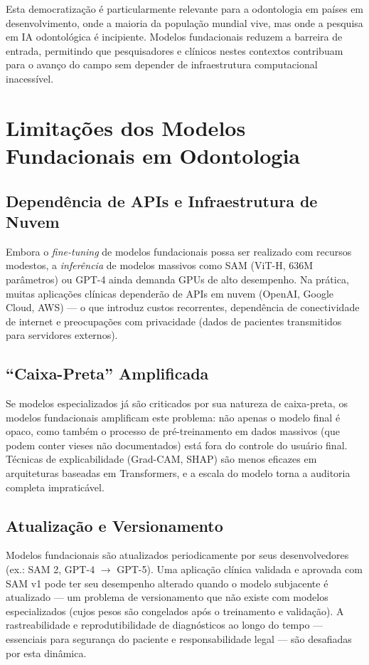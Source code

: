 Esta democratização é particularmente relevante para a odontologia em países em desenvolvimento, onde a maioria da população mundial vive, mas onde a pesquisa em IA odontológica é incipiente. Modelos fundacionais reduzem a barreira de entrada, permitindo que pesquisadores e clínicos nestes contextos contribuam para o avanço do campo sem depender de infraestrutura computacional inacessível.

\section{Limitações dos Modelos Fundacionais em Odontologia}

\subsection{Dependência de APIs e Infraestrutura de Nuvem}

Embora o \textit{fine-tuning} de modelos fundacionais possa ser realizado com recursos modestos, a \textit{inferência} de modelos massivos como SAM (ViT-H, 636M parâmetros) ou GPT-4 ainda demanda GPUs de alto desempenho. Na prática, muitas aplicações clínicas dependerão de APIs em nuvem (OpenAI, Google Cloud, AWS) --- o que introduz custos recorrentes, dependência de conectividade de internet e preocupações com privacidade (dados de pacientes transmitidos para servidores externos).

\subsection{``Caixa-Preta'' Amplificada}

Se modelos especializados já são criticados por sua natureza de caixa-preta, os modelos fundacionais amplificam este problema: não apenas o modelo final é opaco, como também o processo de pré-treinamento em dados massivos (que podem conter vieses não documentados) está fora do controle do usuário final. Técnicas de explicabilidade (Grad-CAM, SHAP) são menos eficazes em arquiteturas baseadas em Transformers, e a escala do modelo torna a auditoria completa impraticável.

\subsection{Atualização e Versionamento}

Modelos fundacionais são atualizados periodicamente por seus desenvolvedores (ex.: SAM 2, GPT-4 $\rightarrow$ GPT-5). Uma aplicação clínica validada e aprovada com SAM v1 pode ter seu desempenho alterado quando o modelo subjacente é atualizado --- um problema de versionamento que não existe com modelos especializados (cujos pesos são congelados após o treinamento e validação). A rastreabilidade e reprodutibilidade de diagnósticos ao longo do tempo --- essenciais para segurança do paciente e responsabilidade legal --- são desafiadas por esta dinâmica.


